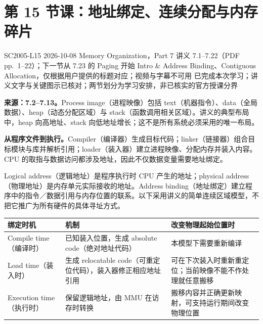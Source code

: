
\section{第 15 节课：地址绑定、连续分配与内存碎片}
\label{lecture:SC2005-L15}

\lecturemeta
  {SC2005-L15}
  {2026-10-08}
  {Memory Organization，Part 7}
  {讲义 7.1--7.22（PDF pp.~1--22）；下一节从 7.23 的 Paging 开始}
  {Intro \& Address Binding、Contiguous Allocation，仅根据用户提供的标题对应；视频与字幕不可用}
  {已完成本次学习；讲义文字与关键图示已核对；两节划分为学习安排，非已核实的官方授课分界}



\textbf{来源：7.2--7.13。}Process image（进程映像）包括 text（机器指令）、data（全局数据）、heap（动态分配区域）与 stack（函数调用相关区域）。讲义的典型布局中，heap 向高地址、stack 向低地址增长；这不是所有系统必须采用的唯一布局。

\textbf{从程序文件到执行。}Compiler（编译器）生成目标代码；linker（链接器）组合目标模块与库并解析引用；loader（装入器）建立进程映像、分配内存并装入内容。CPU 的取指与数据访问都涉及地址，因此不仅数据变量需要地址绑定。

Logical address（逻辑地址）是程序执行时 CPU 产生的地址；physical address（物理地址）是内存单元实际接收的地址。Address binding（地址绑定）建立程序中的指令／数据引用与内存位置的联系。以下采用讲义的简单连续区域模型，不把它推广为所有硬件的具体寻址方式。

\begin{center}
\begin{tabularx}{\textwidth}{@{}>{\raggedright\arraybackslash}p{2.9cm}>{\raggedright\arraybackslash}X>{\raggedright\arraybackslash}X@{}}
\toprule
绑定时机 & 机制 & 改变物理起始位置时 \\
\midrule
Compile time（编译时） & 已知装入位置，生成 absolute code（绝对地址代码） & 本模型下需要重新编译 \\
Load time（装入时） & 生成 relocatable code（可重定位代码），装入器修正相应地址引用 & 可在下次装入时重新重定位；当前映像不能不作处理就任意搬移 \\
Execution time（执行时） & 保留逻辑地址，由 MMU 在访存时转换 & 搬移内容并正确更新映射，可支持运行期间改变物理位置 \\
\bottomrule
\end{tabularx}
\end{center}

